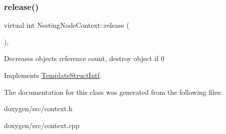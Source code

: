 \mbox{\label{class_nesting_node_context_a12ca8fb9a771ae6785dcb5bbc305a9ab}} 
\subsubsection{\texorpdfstring{release()}{release()}}
{\footnotesize\ttfamily virtual int Nesting\+Node\+Context\+::release (\begin{DoxyParamCaption}{ }\end{DoxyParamCaption})\hspace{0.3cm}{\ttfamily [inline]}, {\ttfamily [virtual]}}

Decreases object\textquotesingle{}s reference count, destroy object if 0 

Implements \mbox{\hyperlink{class_template_struct_intf_a3dce7dd29d3f66a8080b40578e8a5045}{Template\+Struct\+Intf}}.



The documentation for this class was generated from the following files\+:\begin{DoxyCompactItemize}
\item 
doxygen/src/context.\+h\item 
doxygen/src/context.\+cpp\end{DoxyCompactItemize}
